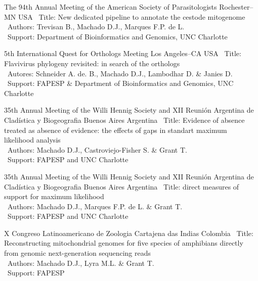 \vspace{.5em}

\cventry{---}
	{The 94th Annual Meeting of the American Society of Parasitologists}
	{Rochester--MN}
	{USA}
	{}
	{
		\textbullet~Title:  New dedicated pipeline to annotate the cestode mitogenome\\
		\textbullet~Authors: Trevisan B., Machado D.J., Marques F.P. de L.\\ \textbullet~Support: Department of Bioinformatics and Genomics,  UNC Charlotte
	}

\vspace{.5em}

	{5th International Quest for Orthologs Meeting}
	{Los Angeles--CA}
	{USA}
	{}
	{
		\textbullet~Title: Flavivirus phylogeny revisited: in search of the orthologs\\
		\textbullet~Autores: Schneider A. de. B., Machado D.J., Lambodhar D. \& Janies D.\\
		\textbullet~Support: FAPESP \& Department of Bioinformatics and Genomics,  UNC Charlotte
	}

\vspace{.5em}

	{35th Annual Meeting of the Willi Hennig Society and XII Reunión Argentina de Cladística y Biogeografia}
	{Buenos Aires}
	{Argentina}
	{}
	{
		\textbullet~Title: Evidence of absence treated as absence of evidence: the effects of gaps in standart maximum likelihood analysis\\
		\textbullet~Authors: Machado D.J., Castroviejo-Fisher S. \& Grant T.\\
		\textbullet~Support: FAPESP and UNC Charlotte
	}

\vspace{.5em}

\cventry{---}
	{35th Annual Meeting of the Willi Hennig Society and XII Reunión Argentina de Cladística y Biogeografia}
	{Buenos Aires}
	{Argentina}
	{}
	{
		\textbullet~Title: direct measures of support for maximum likelihood\\
		\textbullet~Authors: Machado D.J., Marques F.P. de L. \& Grant T.\\
		\textbullet~Support: FAPESP and UNC Charlotte
	}

\vspace{.5em}

	{X Congreso Latinoamericano de Zoologia}
	{Cartajena das Indias}
	{Colombia}
	{}
	{
		\textbullet~Title: Reconstructing mitochondrial genomes for five species of amphibians directly from genomic next-generation sequencing reads\\
		\textbullet~Authors: Machado D.J., Lyra M.L. \& Grant T.\\
		\textbullet~Support: FAPESP
	}

